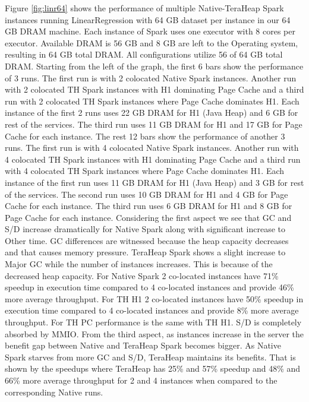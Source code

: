 Figure \ref{fig:linr64} shows the performance of multiple
Native-TeraHeap Spark instances running LinearRegression with 64 GB
dataset per instance in our 64 GB DRAM machine. Each instance of Spark
uses one executor with 8 cores per executor. Available DRAM is 56 GB
and 8 GB are left to the Operating system, resulting in 64 GB total
DRAM. All configurations utilize 56 of 64 GB total DRAM. 
Starting from the left of the graph, the first 6 bars show the
performance of 3 runs. The first run is with 2 colocated Native Spark instances.
Another run with 2 colocated TH Spark instances with H1 dominating Page Cache
and a third run with 2 colocated TH Spark instances where Page Cache dominates H1. 
Each instance of the first 2 runs uses 22 GB DRAM for H1 (Java Heap) and 6 GB for rest of the services.
The third run uses 11 GB DRAM for H1 and 17 GB for Page Cache for each instance. 
The rest 12 bars show the performance of another 3 runs. The first run is with 4 colocated Native Spark instances.
Another run with 4 colocated TH Spark instances with H1 dominating Page Cache
and a third run with 4 colocated TH Spark instances where Page Cache dominates H1. 
Each instance of the first run uses 11 GB DRAM for H1 (Java Heap) and 3 GB for rest of the services. 
The second run uses 10 GB DRAM for H1 and 4 GB for Page Cache for each instance. 
The third run uses 6 GB DRAM for H1 and 8 GB for Page Cache for each instance. 
Considering the first aspect we see that GC and S/D increase dramatically for Native Spark along with significant increase to Other time. GC differences are witnessed because the heap capacity decreases and that causes memory pressure. TeraHeap Spark shows a slight increase to Major GC while the number of instances increases. This is because of the decreased heap capacity. For Native Spark 2 co-located instances have 71\% speedup in execution time compared to 4 co-located instances and provide 46\% more average throughput. For TH H1 2 co-located instances have 50\% speedup in execution time compared to 4 co-located instances and provide 8\% more average throughput. For TH PC performance is the same with TH H1. 
S/D is completely absorbed by MMIO. From the third aspect, as instances increase in the server the benefit gap between Native and TeraHeap Spark becomes bigger. As Native Spark starves from more GC and S/D, TeraHeap maintains its benefits. That is shown by the speedups where TeraHeap has 25\% and 57\% speedup and 48\% and 66\% more average throughput for 2 and 4 instances when compared to the corresponding Native runs.

